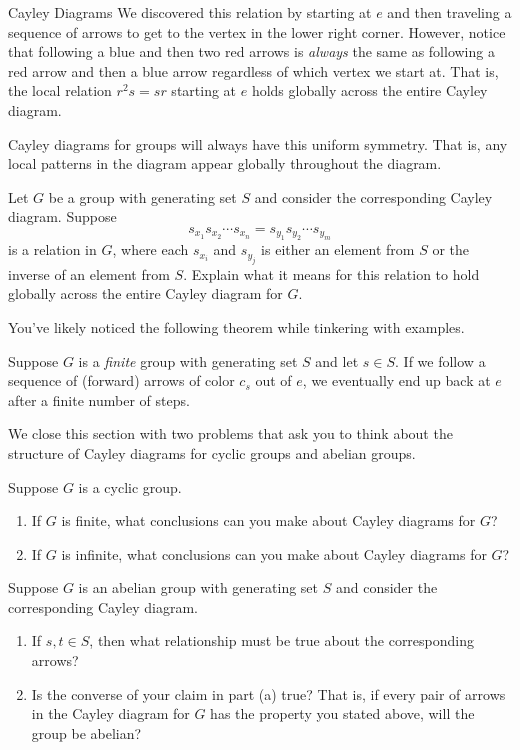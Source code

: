 \begin{section}{Cayley Diagrams}
We discovered this relation by starting at $e$ and then traveling a sequence of arrows to get to the vertex in the lower right corner.  However, notice that following a blue and then two red arrows is \emph{always} the same as following a red arrow and then a blue arrow regardless of which vertex we start at.  That is, the local relation $r^2s=sr$ starting at $e$ holds globally across the entire Cayley diagram.

Cayley diagrams for groups will always have this uniform symmetry. That is, any local patterns in the diagram appear globally throughout the diagram. 

\begin{problem}
Let $G$ be a group with generating set $S$ and consider the corresponding Cayley diagram. Suppose
\[
s_{x_1}s_{x_2}\cdots s_{x_n}=s_{y_1}s_{y_2}\cdots s_{y_m}
\]
is a relation in $G$, where each $s_{x_i}$ and $s_{y_j}$ is either an element from $S$ or the inverse of an element from $S$.  Explain what it means for this relation to hold globally across the entire Cayley diagram for $G$.
\end{problem}

You've likely noticed the following theorem while tinkering with examples.

\begin{theorem}
Suppose $G$ is a \emph{finite} group with generating set $S$ and let $s\in S$.  If we follow a sequence of (forward) arrows of color $c_s$ out of $e$, we eventually end up back at $e$ after a finite number of steps.
\end{theorem}

We close this section with two problems that ask you to think about the structure of Cayley diagrams for cyclic groups and abelian groups.

\begin{problem}
Suppose $G$ is a cyclic group. 
\begin{enumerate}[label=\rm{(\alph*)}]
\item If $G$ is finite, what conclusions can you make about Cayley diagrams for $G$?
\item If $G$ is infinite, what conclusions can you make about Cayley diagrams for $G$?
\end{enumerate}
\end{problem}

\begin{problem}
Suppose $G$ is an abelian group with generating set $S$ and consider the corresponding Cayley diagram.
\begin{enumerate}[label=\rm{(\alph*)}]
\item If $s,t\in S$, then what relationship must be true about the corresponding arrows?
\item Is the converse of your claim in part (a) true?  That is, if every pair of arrows in the Cayley diagram for $G$ has the property you stated above, will the group be abelian?
\end{enumerate}
\end{problem}

\end{section}

